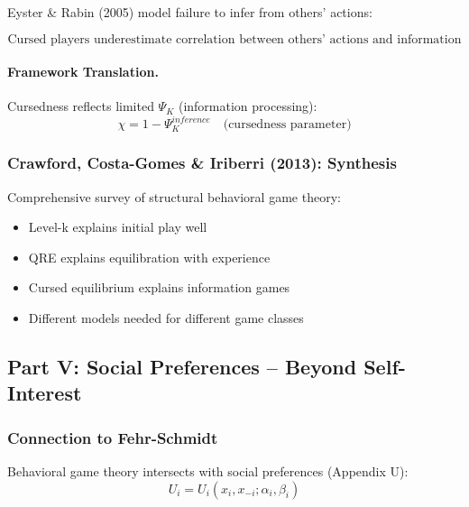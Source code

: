 Eyster \& Rabin (2005) model failure to infer from others' actions:

\begin{equation}
\boxed{
\text{Cursed players underestimate correlation between others' actions and information}
}
\label{eq:cursed}
\end{equation}

\paragraph{Framework Translation.}
Cursedness reflects limited $\Psi_K$ (information processing):
\begin{equation}
\chi = 1 - \Psi_K^{inference} \quad \text{(cursedness parameter)}
\end{equation}

\subsubsection{Crawford, Costa-Gomes \& Iriberri (2013): Synthesis}

Comprehensive survey of structural behavioral game theory:
\begin{itemize}
    \item Level-k explains initial play well
    \item QRE explains equilibration with experience
    \item Cursed equilibrium explains information games
    \item Different models needed for different game classes
\end{itemize}

\subsection{Part V: Social Preferences – Beyond Self-Interest}

\subsubsection{Connection to Fehr-Schmidt}

Behavioral game theory intersects with social preferences (Appendix U):
\begin{equation}
U_i = U_i(x_i, x_{-i}; \alpha_i, \beta_i)
\end{equation}

